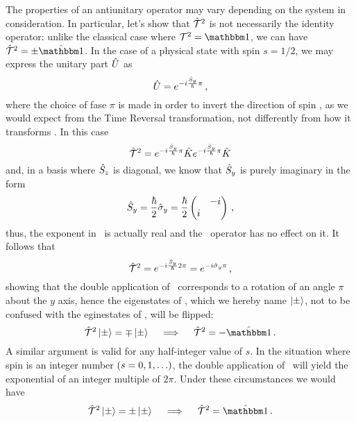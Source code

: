         The properties of an antiunitary operator may vary depending on the system in consideration. In particular, let's show that $\mathcal{\hat{T}}^2$ is not necessarily the identity operator: unlike the classical case where $\mcT^2 = \idM$, we can have $\hT^2 = \pm\togglehat{\idM}$. In the case of a physical state with spin $s = 1/2$, we may express the unitary part $\hat{U}$ as
        \begin{equation*}
            \hat{U} = e^{-i \frac{\hat{S}_y}{\hbar} \pi}
            \,\text{,}
        \end{equation*}
        where the choice of fase $\pi$ is made in order to invert the direction of spin \hvS, as we would expect from the Time Reversal transformation, not differently from how it transforms \hvp. In this case
        \begin{equation*}
            \mathcal{\hat{T}}^2 = e^{-i \frac{\hat{S}_y}{\hbar} \pi} \hat{K} e^{-i \frac{\hat{S}_y}{\hbar} \pi} \hat{K}
        \end{equation*}
        and, in a basis where $\hat{S}_z$ is diagonal, we know that $\hat{S}_y$ is purely imaginary in  the form
        \begin{equation*}
            \hSy
            = \frac{\hbar}{2} \togglehat{\sigma}_y
            = \frac{\hbar}{2} \pmqty{\admat{-i,i}}
            \mycomma
        \end{equation*}
        thus, the exponent in \hU\ is actually real and the \hK\ operator has no effect on it. It follows that
        \begin{equation*}
            \mathcal{\hat{T}}^2
            = e^{-i \frac{\hat{S}_y}{\hbar} 2\pi}
            = e^{-i \hat{\sigma}_y \pi}
            \,\text{,}
        \end{equation*}
        showing that the double application of \hT\ corresponds to a rotation of an angle $\pi$ about the $y$ axis, hence the eigenstates of \hSz, which we hereby name $\ket{\pm}$, not to be confused with the eginestates of \hP, will be flipped:
        \begin{equation*}
            \hT^2 \ket{\pm} = \mp \ket{\pm}
            \quad\implies\quad
            \hT^2 = -\togglehat{\idM}
            \myperiod
        \end{equation*}
        A similar argument is valid for any half-integer value of $s$. In the situation where spin is an integer number $\pqty{s = 0,1,\ldots}$, the double application of \hK\ will yield the exponential of an integer multiple of $2\pi$. Under these circumstances we would have
        \begin{equation*}
            \hT^2 \ket{\pm} = \pm\ket{\pm}
            \quad\implies\quad
            \hT^2 = \togglehat{\idM}
            \myperiod
        \end{equation*}


